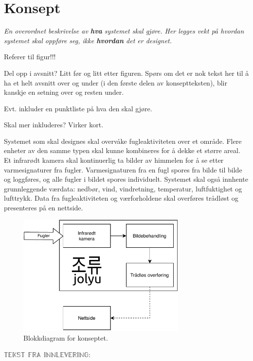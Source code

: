 \section{Konsept}
\label{sec:konsept}
\textit{En overordnet beskrivelse av \textbf{hva} systemet skal gjøre. Her legges vekt på hvordan systemet skal oppføre seg, ikke \textbf{hvordan} det er designet.}

Referer til figur!!!

Del opp i avsnitt? Litt før og litt etter figuren. 
Spørs om det er nok tekst her til å ha et helt avsnitt over og under (i den første delen av konseptteksten), blir kanskje en setning over og resten under.

Evt. inkluder en punktliste på hva den skal gjøre.

Skal mer inkluderes? Virker kort.

Systemet som skal designes skal overvåke fugleaktiviteten over et område. Flere enheter av den samme typen skal kunne kombineres for å dekke et større areal. Et infrarødt kamera skal kontinuerlig ta bilder av himmelen for å se etter varmesignaturer fra fugler. Varmesignaturen fra en fugl spores fra bilde til bilde og loggføres, og alle fugler i bildet spores individuelt. Systemet skal også innhente grunnleggende værdata: nedbør, vind, vindretning, temperatur, luftfuktighet og lufttrykk. Data fra fugleaktiviteten og værforholdene skal overføres trådløst og presenteres på en nettside.

\begin{figure}[H]
    \centering
    \includegraphics[width=0.75\textwidth]{konsept/Diagram_konsept.pdf}
    \caption{Blokkdiagram for konseptet.}
    \label{fig:konsept}
\end{figure}
 

$\mathbb{TEKST} \:\: \mathbb{FRA} \:\: \mathbb{INNLEVERING}$:

